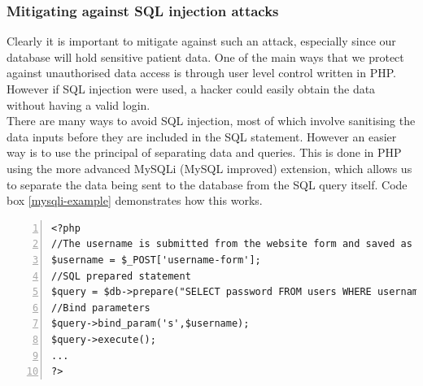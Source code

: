 \documentclass[11pt]{article}
\begin{document}
\subsubsection{Mitigating against SQL injection attacks}
Clearly it is important to mitigate against such an attack, especially since our database will hold sensitive patient data. One of the main ways that we protect against unauthorised data access is through user level control written in PHP. However if SQL injection were used, a hacker could easily obtain the data without having a valid login. 
\\ \indent
There are many ways to avoid SQL injection, most of which involve sanitising the data inputs before they are included in the SQL statement. However an easier way is to use the principal of separating data and queries. This is done in PHP using the more advanced MySQLi (MySQL improved) extension, which allows us to separate the data being sent to the database from the SQL query itself. Code box \ref{mysqli-example} demonstrates how this works.


\begin{lstlisting}[float=ht,numbers=left,frame=lines,caption="Example code showing MySQLi extension usage",label=mysqli-example,showstringspaces=false]
<?php
//The username is submitted from the website form and saved as php variable
$username = $_POST['username-form'];
//SQL prepared statement
$query = $db->prepare("SELECT password FROM users WHERE username=?");
//Bind parameters
$query->bind_param('s',$username);
$query->execute();
...
?>
\end{lstlisting}
\end{document}
